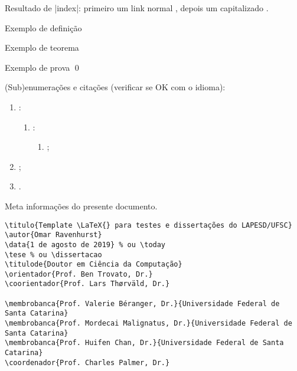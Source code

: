Resultado de \mla|index|: primeiro um link normal , depois um capitalizado .

\begin{defn}
  Exemplo de definição
\end{defn}

\begin{theorem}
  Exemplo de teorema
\end{theorem}

\begin{theoremproof}
  Exemplo de prova \qed
\end{theoremproof}

(Sub)enumerações e citações (verificar se OK com o idioma):
\begin{enumerate}
\item \cite{turing1937}:
  \begin{enumerate}
  \item {}:
    \begin{enumerate}
    \item {};
    \end{enumerate}
  \end{enumerate}
\item \cite{turing1937,dijkstra1968};
\item {}.
\end{enumerate}


\begin{listing}[tb]
\caption{Meta informações do presente documento.}
\label{lst:meta}
\begin{verbatim}
\titulo{Template \LaTeX{} para testes e dissertações do LAPESD/UFSC}
\autor{Omar Ravenhurst}
\data{1 de agosto de 2019} % ou \today
\tese % ou \dissertacao
\titulode{Doutor em Ciência da Computação}
\orientador{Prof. Ben Trovato, Dr.}
\coorientador{Prof. Lars Thørväld, Dr.}

\membrobanca{Prof. Valerie Béranger, Dr.}{Universidade Federal de Santa Catarina}
\membrobanca{Prof. Mordecai Malignatus, Dr.}{Universidade Federal de Santa Catarina}
\membrobanca{Prof. Huifen Chan, Dr.}{Universidade Federal de Santa Catarina}
\coordenador{Prof. Charles Palmer, Dr.}
\end{verbatim}
\end{listing}


